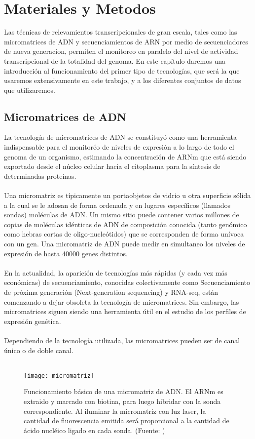 \chapter{Materiales y Metodos}\label{materiales_y_metodos}
Las técnicas de relevamientos transcripcionales de gran escala, tales como las micromatrices de ADN y secuenciamientos de ARN por medio de secuenciadores de nueva generacion, permiten el monitoreo en paralelo del nivel de actividad transcripcional de la totalidad del genoma. En este capítulo daremos una introducción al funcionamiento del primer tipo de tecnologías, que será la que usaremos extensivamente en este trabajo, y a los diferentes conjuntos de datos que utilizaremos.\cite{Bose2016}

\section{Micromatrices de ADN}
La tecnología de micromatrices de ADN se constituyó como una herramienta indispensable para el monitoréo de niveles de expresión a lo largo de todo el genoma de un organismo, estimando la concentración de ARNm que está siendo exportado desde el núcleo celular hacia el citoplasma para la síntesis de determinadas proteínas.\\\\
Una micromatriz es típicamente un portaobjetos de vidrio u otra superficie sólida a la cual se le adosan de forma ordenada y en lugares específicos (llamados sondas) moléculas de ADN. Un mismo sitio puede contener varios millones de copias de moléculas idénticas de ADN de composición conocida (tanto genómico como hebras cortas de oligo-nucleótidos) que se corresponden de forma unívoca con un gen. Una micromatriz de ADN puede medir en simultaneo los niveles de expresión de hasta 40000 genes distintos.\\\\
En la actualidad, la aparición de tecnologías más rápidas (y cada vez más económicas) de secuenciamiento, conocidas colectivamente como Secuenciamiento de próxima generación (Next-generation sequencing) y RNA-seq, están comenzando a dejar obsoleta la tecnología de micromatrices. Sin embargo, las micromatrices siguen siendo una herramienta útil en el estudio de los perfiles de expresión genética.\\\\
Dependiendo de la tecnología utilizada, las micromatrices pueden ser de canal único o de doble canal.\\\\
\begin{figure}[h]
    \centering
    \texttt{[image: micromatriz]}
    \caption{Funcionamiento básico de una micromatriz de ADN. El ARNm es extraido y marcado con biotina, para luego hibridar con la sonda correspondiente. Al iluminar la micromatriz con luz laser, la cantidad de fluorescencia emitida será proporcional a la cantidad de ácido nucléico ligado en cada sonda. (Fuente: \cite{Babu2004})}
    \label{fig:micromatriz}
\end{figure}

